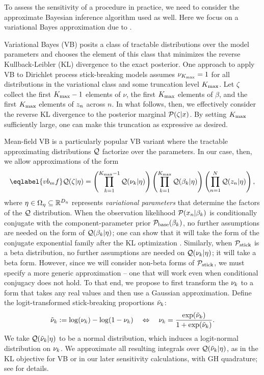 To assess the sensitivity of a procedure in practice, we need to consider the
approximate Bayesian inference algorithm used as well. Here we focus on a
variational Bayes approximation due to \citet{blei:2006:vi_for_dp}.

Variational Bayes (VB) posits a class of tractable distributions over the model
parameters and chooses the  element of this class that minimizes the reverse
Kullback-Leibler (KL) divergence to the exact posterior.  One approach to apply
VB to Dirichlet process stick-breaking models assumes $\nu_{K_{\mathrm{max}}} = 1$ for all
distributions in the variational class and some truncation level ${K_{\mathrm{max}}}$. Let
$\zeta$ collect the first ${K_{\mathrm{max}}} - 1$ elements of $\nu$, the first ${K_{\mathrm{max}}}$
elements of $\beta$, and the first ${K_{\mathrm{max}}}$ elements of $z_n$ across $n$. In
what follows, then, we effectively consider the reverse KL divergence to the
posterior marginal $\mathcal{P}(\zeta \vert x)$. By setting ${K_{\mathrm{max}}}$ sufficiently large,
one can make this truncation as expressive as desired.

Mean-field VB is a particularly popular VB variant where the tractable
approximating distributions $\mathcal{Q}$ factorize over the parameters. In our case,
then, we allow approximations of the form
%
\begin{align}\eqlabel{vb_mf}
%
\q(\zeta \vert \eta) =
    \left( \prod_{\k=1}^{\kmax - 1} \q(\nuk \vert \eta) \right)
    \left( \prod_{\k=1}^{\kmax} \q(\beta_\k \vert \eta) \right)
    \left( \prod_{\n=1}^{\N} \q(\z_{\n} \vert \eta) \right),
%
\end{align}
%
where $\eta \in \Omega_{\eta} \subseteq \mathbb{R}^{{D_{\eta}}}$ represents
\emph{variational parameters} that determine the factors of the $\mathcal{Q}$
distribution. When the observation likelihood $\mathcal{P}(x_n \vert \beta_k)$ is
conditionally conjugate with the component-parameter prior
$\mathcal{P}_{\mathrm{base}}(\beta_k)$, no further assumptions are needed on the form of
$\mathcal{Q}(\beta_k \vert \eta)$; one can show that it will take the form of the
conjugate exponential family after the KL optimization
\citep{blei:2017:vi_review}. Similarly, when $\mathcal{P}_{\mathrm{stick}}$ is a beta distribution,
no further assumptions are needed on $\mathcal{Q}(\nu_{k} \vert \eta)$; it will take a beta
form. However, since we will consider non-beta forms of $\mathcal{P}_{\mathrm{stick}}$, we must
specify a more generic approximation -- one that will work even when conditional
conjugacy does not hold. To that end, we propose to first transform the $\nu_{k}$
to a form that takes any real values and then use a Gaussian approximation.
Define the logit-transformed stick-breaking proportions $\tilde{\nu}_{k}$:
%
\begin{align*}
  \lnu_\k := \log(\nu_\k) - \log(1 - \nu_\k)
  \quad \Leftrightarrow \quad
  \nuk = \frac{\exp(\lnu_\k)}{1 + \exp(\lnu_\k)}.
\end{align*}
%
We take $\mathcal{Q}(\tilde{\nu}_{k} \vert \eta)$ to be a normal distribution, which induces a
logit-normal distribution on $\nu_{k}$. We approximate all resulting integrals over
$\mathcal{Q}(\tilde{\nu}_{k} \vert \eta)$, as in the KL objective for VB or in our later
sensitivity calculations, with GH quadrature; see  for
details.

